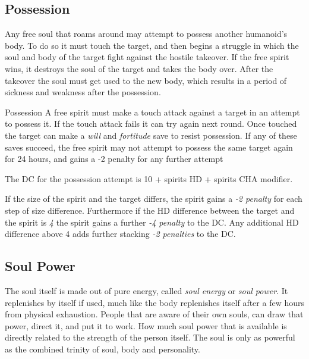 \subsection{Possession}
\label{sec:Possession}

Any free soul that roams around may attempt to possess another humanoid's
body. To do so it must touch the target, and then begins a struggle in which
the soul and body of the target fight against the hostile takeover. If the
free spirit wins, it destroys the soul of the target and takes the body over.
After the takeover the soul must get used to the new body, which results in
a period of sickness and weakness after the possession.

\begin{35e}{Possession}
  A free spirit must make a touch attack against a target in an attempt to
  possess it. If the touch attack fails it can try again next round. Once
  touched the target can make a \emph{will} and \emph{fortitude} save to
  resist possession. If any of these saves succeed, the free spirit may not
  attempt to possess the same target again for 24 hours, and gains a -2
  penalty for any further attempt

  The DC for the possession attempt is 10 + spirits HD + spirits CHA modifier.

  If the size of the spirit and the target differs, the spirit gains a
  \emph{-2 penalty} for each step of size difference. Furthermore if the
  HD difference between the target and the spirit is \emph{4} the spirit gains
  a further \emph{-4 penalty} to the DC. Any additional HD difference above
  4 adds further stacking \emph{-2 penalties} to the DC.
\end{35e}

\subsection{Soul Power}
\label{sec:Soul Power}

The soul itself is made out of pure energy, called \emph{soul energy} or
\emph{soul power}. It replenishes by itself if used, much like the body
replenishes itself after a few hours from physical exhaustion. People that
are aware of their own souls, can draw that power, direct it, and put it to
work. How much soul power that is available is directly related to the strength
of the person itself. The soul is only as powerful as the combined trinity of
soul, body and personality.

